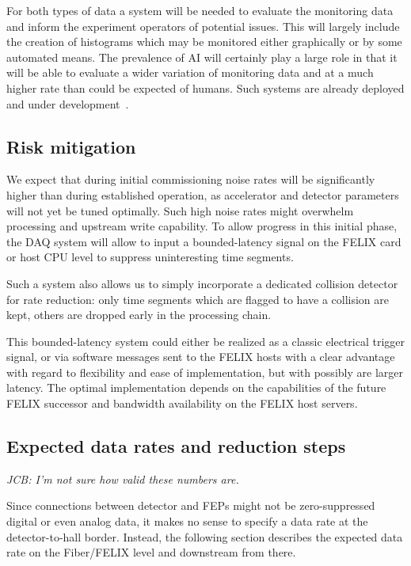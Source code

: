 For both types of data a system will be needed to evaluate the monitoring data and inform the experiment operators of potential issues. This will largely include the creation of histograms which may be monitored either graphically or by some automated means. The prevalence of AI will certainly play a large role in that it will be able to evaluate a wider variation of monitoring data and at a much higher rate than could be expected of humans. Such systems are already deployed and under development~\cite{Hydra2021}. 

\subsection{Risk mitigation}
We expect that during initial commissioning noise rates will be significantly higher than during established operation, as accelerator and detector parameters will not yet be tuned optimally. Such high noise rates might overwhelm processing and upstream write capability. To allow progress in this initial phase, the DAQ system will allow to input a bounded-latency signal on the FELIX card or host CPU level to suppress uninteresting time segments.

Such a system also allows us to simply incorporate a dedicated collision detector for rate reduction: only time segments which are flagged to have a collision are kept, others are dropped early in the processing chain. 

This bounded-latency system could either be realized as a classic electrical trigger signal, or via software messages sent to the FELIX hosts with a clear advantage with regard to flexibility and ease of implementation, but with possibly are larger latency. The optimal implementation depends on the capabilities of the future FELIX successor and bandwidth availability on the FELIX host servers.

\subsection{Expected data rates and reduction steps}

\emph{JCB: I'm not sure how valid these numbers are.}

Since connections between detector and FEPs might not be zero-suppressed digital or even analog data, it makes no sense to specify a data rate at the detector-to-hall border. Instead, the following section describes the expected data rate on the Fiber/FELIX level and downstream from there.

